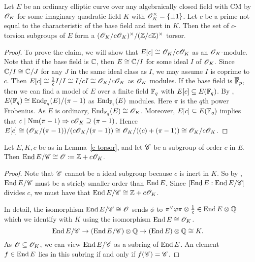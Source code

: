 \documentclass{amsart}
\begin{document}
\begin{lemma}\label{c-torsor}
  Let $E$ be an ordinary elliptic curve over any algebraically closed field with CM by $\mathscr{O}_K$ for some imaginary quadratic field $K$ with $\mathscr{O}_K^\times = \{\pm 1\}$. Let $c$ be a prime not equal to the characteristic of the base field and inert in $K$. Then the set of $c$-torsion subgroups of $E$ form a $(\mathscr{O}_K/c\mathscr{O}_K)^\times/(\mathbb{Z}/c\mathbb{Z})^\times$ torsor.
\end{lemma}
\begin{proof}
  To prove the claim, we will show that $E[c] \cong \mathscr{O}_K/c\mathscr{O}_K$ as an $\mathscr{O}_K$-module. Note that if the base field is $\mathbb{C}$, then $E \cong \mathbb{C}/I$ for some ideal $I$ of $\mathscr{O}_K$. Since $\mathbb{C}/I \cong \mathbb{C}/J$ for any $J$ in the same ideal class as $I$, we may assume $I$ is coprime to $c$. Then $E[c] \cong \frac{1}{c}I/I \cong I/cI \cong \mathscr{O}_K/c\mathscr{O}_K$ as $\mathscr{O}_K$ modules. If the base field is $\overline{\mathbb{F}}_p$, then we can find a model of $E$ over a finite field $\mathbb{F}_q$ with $E[c] \subseteq E(\mathbb{F}_q)$. By \cite[Thm.~1]{complex1996lenstra}, $E(\mathbb{F}_q) \cong \operatorname{End}_{\mathbb{F}_q}(E) / (\pi - 1)$ as $\operatorname{End}_{\mathbb{F}_q}(E)$ modules. Here $\pi$ is the $q$th power Frobenius. As $E$ is ordinary, $\operatorname{End}_{\mathbb{F}_q}(E) \cong \mathscr{O}_K$. Moreover, $E[c] \subseteq E(\mathbb{F}_q)$ implies that $c \mid \operatorname{Nm}(\pi - 1) \Rightarrow c\mathscr{O}_K \supseteq (\pi - 1)$. Hence $E[c] \cong (\mathscr{O}_K/(\pi - 1))/(c\mathscr{O}_K/(\pi - 1)) \cong \mathscr{O}_K/((c) + (\pi - 1)) \cong \mathscr{O}_K/c\mathscr{O}_K$.
\end{proof}

\begin{lemma}\label{lem:end-E/C}
  Let $E,K,c$ be as in Lemma~\ref{c-torsor}, and let $\mathscr{C}$ be a subgroup of order $c$ in $E$. Then $\operatorname{End} E/\mathscr{C} \cong \mathscr{O} := \mathbb{Z} + c\mathscr{O}_K$.
\end{lemma}
\begin{proof}
  Note that $\mathscr{C}$ cannot be a ideal subgroup because $c$ is inert in $K$. So by \cite[Thm.~20b]{kani2011products}, $\operatorname{End} E/\mathscr{C}$ must be a stricly smaller order than $\operatorname{End} E$. Since $[\operatorname{End} E : \operatorname{End} E/\mathscr{C}]$ divides $c$, we must have that $\operatorname{End} E/\mathscr{C} \cong \mathbb{Z} + c\mathscr{O}_K$.

  In detail, the isomorphism $\operatorname{End} E/\mathscr{C} \cong \mathscr{O}$ sends $\phi$ to $\pi^\vee\varphi\pi\otimes\frac{1}{c} \in \operatorname{End} E \otimes \mathbb{Q}$ which we identify with $K$ using the isomorphism $\operatorname{End} E \cong \mathscr{O}_K$.
  \[
    \operatorname{End} E/\mathscr{C} \to (\operatorname{End} E/\mathscr{C}) \otimes \mathbb{Q} \to (\operatorname{End} E) \otimes \mathbb{Q} \cong K.
  \]
  As $\mathscr{O} \subseteq \mathscr{O}_K$, we can view $\operatorname{End} E/\mathscr{C}$ as a subring of $\operatorname{End} E$. An element $f \in \operatorname{End} E$ lies in this subring if and only if $f(\mathscr{C}) = \mathscr{C}$.
\end{proof}
\end{document}
